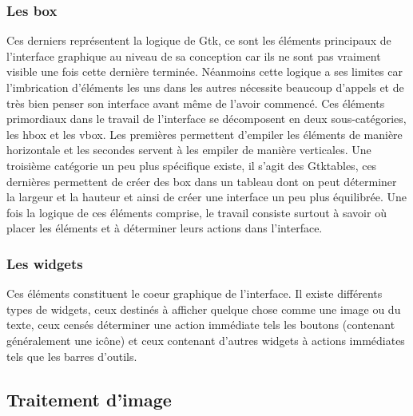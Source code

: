 \documentclass[12pt]{article}
\begin{document}
\subsubsection{Les box}
Ces derniers représentent la logique de Gtk, ce sont les éléments principaux
de l’interface graphique au niveau de sa conception car ils ne sont pas vraiment
visible une fois cette dernière terminée. Néanmoins cette logique a ses limites
car l’imbrication d’éléments les uns dans les autres nécessite beaucoup d’appels
et de très bien penser son interface avant même de l’avoir commencé.
Ces éléments primordiaux dans le travail de l’interface se décomposent en
deux sous-catégories, les hbox et les vbox. Les premières permettent d’empiler
les éléments de manière horizontale et les secondes servent à les empiler
de manière verticales. Une troisième catégorie un peu plus spécifique existe, il
s’agit des Gtktables, ces dernières permettent de créer des box dans un tableau
dont on peut déterminer la largeur et la hauteur et ainsi de créer une interface
un peu plus équilibrée.
Une fois la logique de ces éléments comprise, le travail consiste surtout à
savoir où placer les éléments et à déterminer leurs actions dans l’interface.

\subsubsection{Les widgets}
Ces éléments constituent le coeur graphique de l’interface. Il existe différents types de widgets, ceux destinés à afficher quelque chose comme une image ou du texte, ceux censés déterminer une action immédiate tels les boutons (contenant généralement une icône) et ceux contenant d’autres widgets à actions
immédiates tels que les barres d’outils.

\newpage

\subsection{Traitement d'image}
\end{document}
